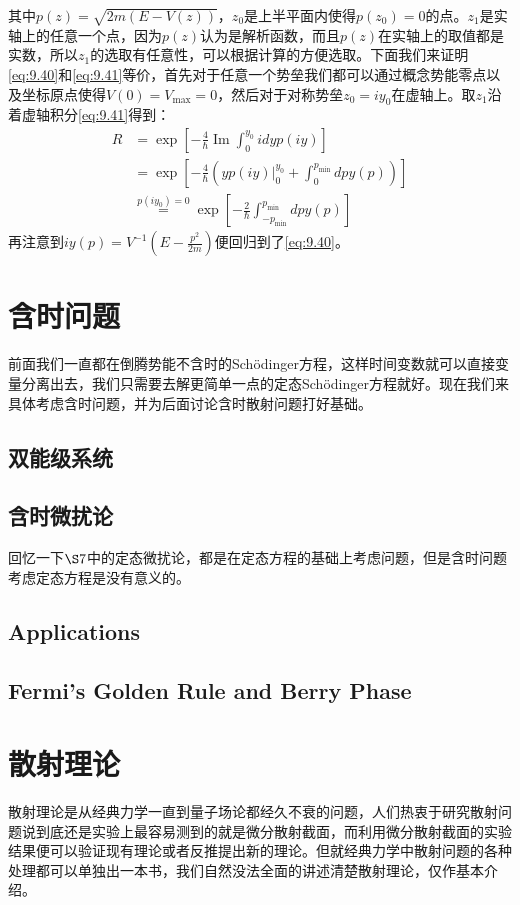 \documentclass[a4paper,zihao=-4,linespread=1]{ctexrep}
\begin{document}
	其中$p(z)=\sqrt{2m(E-V(z))}$，$z_0$是上半平面内使得$p(z_0)=0$的点。$z_1$是实轴上的任意一个点，因为$p(z)$认为是解析函数，而且$p(z)$在实轴上的取值都是实数，所以$z_1$的选取有任意性，可以根据计算的方便选取。下面我们来证明\ref{eq:9.40}和\ref{eq:9.41}等价，首先对于任意一个势垒我们都可以通过概念势能零点以及坐标原点使得$V(0)=V_{\max}=0$，然后对于对称势垒$z_0=iy_0$在虚轴上。取$z_1$沿着虚轴积分\ref{eq:9.41}得到：
	\begin{align*}
		R&=\exp \left[-\frac{4}{\hbar} \operatorname{Im} \int_{0}^{y_{0}} i d y p(i y)\right]\\
		&=\exp\left[-\frac{4}{\hbar}\left(\left.y p(i y)\right|_{0} ^{y_{0}}+\int_{0}^{p_{\min }} d p y(p)\right)\right]\\
		&\overset{p(iy_0)=0}{=}\exp\left[-\frac{2}{\hbar}\int_{-p_{\min}}^{p_{\min }} d p y(p)\right]
	\end{align*}
	再注意到$iy(p)=V^{-1}\left(E-\frac{p^{2}}{2 m}\right)$便回归到了\ref{eq:9.40}。
	
	\chapter{含时问题}
	前面我们一直都在倒腾势能不含时的Sch\"{o}dinger方程，这样时间变数就可以直接变量分离出去，我们只需要去解更简单一点的定态Sch\"{o}dinger方程就好。现在我们来具体考虑含时问题，并为后面讨论含时散射问题打好基础。
	
	\section{双能级系统}
	
	\section{含时微扰论}
	回忆一下$\S 7$中的定态微扰论，都是在定态方程的基础上考虑问题，但是含时问题考虑定态方程是没有意义的。
	
	\section{Applications}
	
	\section{Fermi's Golden Rule and Berry Phase}
	
	
    \chapter{散射理论}
	散射理论是从经典力学一直到量子场论都经久不衰的问题，人们热衷于研究散射问题说到底还是实验上最容易测到的就是微分散射截面，而利用微分散射截面的实验结果便可以验证现有理论或者反推提出新的理论。但就经典力学中散射问题的各种处理都可以单独出一本书，我们自然没法全面的讲述清楚散射理论，仅作基本介绍。
	
\end{document}
